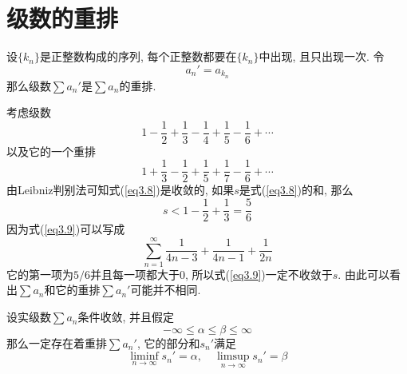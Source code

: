 \documentclass[cn,12pt,math=mtpro2,citestyle=gb7714-2015,bibstyle=gb7714-2015,twocol]{elegantbook}
\begin{document}
\section{级数的重排}
\begin{definition}\label{def:def3.4}
设$\{k_n\}$是正整数构成的序列, 每个正整数都要在$\{k_n\}$中出现, 且只出现一次. 令
$$a_n'=a_{k_n}$$
那么级数$\sum a_n'$是$\sum a_n$的重排.
\end{definition}
\begin{example}
考虑级数
\begin{equation}\label{eq3.8}
  1-\frac{1}{2}+\frac{1}{3}-\frac{1}{4}+\frac{1}{5}-\frac{1}{6}+\cdots
\end{equation}
以及它的一个重排
\begin{equation}\label{eq3.9}
  1+\frac{1}{3}-\frac{1}{2}+\frac{1}{5}+\frac{1}{7}-\frac{1}{6}+\cdots
\end{equation}
由Leibniz判别法可知式(\ref{eq3.8})是收敛的, 如果$s$是式(\ref{eq3.8})的和, 那么
$$\displaystyle s<1-\frac{1}{2}+\frac{1}{3}=\frac{5}{6}$$
因为式(\ref{eq3.9})可以写成
$$\sum_{n=1}^{\infty}\frac{1}{4n-3}+\frac{1}{4n-1}+\frac{1}{2n}$$
它的第一项为$5/6$并且每一项都大于0, 所以式(\ref{eq3.9})一定不收敛于$s$. 由此可以看出$\sum a_n$和它的重排$\sum a_n'$可能并不相同.
\end{example}
\begin{theorem}[Riemann重排定理]
  设实级数$\sum a_n$条件收敛, 并且假定
  $$-\infty\leq\alpha\leq\beta\leq\infty$$
  那么一定存在着重排$\sum a_n'$, 它的部分和$s_n'$满足
  \begin{equation}\label{eq3.10}
     \liminf_{n\to\infty} s_n'=\alpha,\quad\limsup_{n\to\infty} s_n'=\beta
  \end{equation}
\end{theorem}
\end{document}
